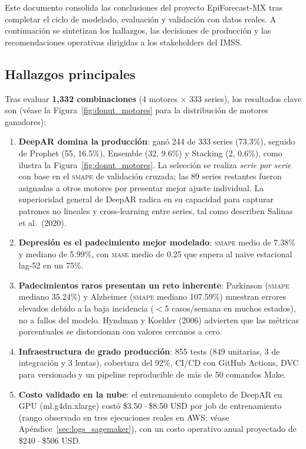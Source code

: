 \documentclass[12pt, letterpaper]{article}
\newcommand{\smape}{\textnormal{\textsc{smape}}}
\newcommand{\mase}{\textnormal{\textsc{mase}}}
\newcommand{\figref}[1]{Figura~\ref{#1}}
\begin{document}
Este documento consolida las conclusiones del proyecto EpiForecast-MX tras completar el ciclo de modelado, evaluación y validación con datos reales. A continuación se sintetizan los hallazgos, las decisiones de producción y las recomendaciones operativas dirigidas a los stakeholders del IMSS.

\subsection{Hallazgos principales}

Tras evaluar \textbf{1,332 combinaciones} (4 motores $\times$ 333 series), los resultados clave son (véase la \figref{fig:donut_motores} para la distribución de motores ganadores):

\begin{enumerate}[noitemsep]
    \item \textbf{DeepAR domina la producción}: ganó 244 de 333 series (73.3\%), seguido de Prophet (55, 16.5\%), Ensemble (32, 9.6\%) y Stacking (2, 0.6\%), como ilustra la \figref{fig:donut_motores}. La selección se realiza \textit{serie por serie} con base en el \smape{} de validación cruzada; las 89 series restantes fueron asignadas a otros motores por presentar mejor ajuste individual. La superioridad general de DeepAR radica en su capacidad para capturar patrones no lineales y cross-learning entre series, tal como describen Salinas et al.\ (2020).
    \item \textbf{Depresión es el padecimiento mejor modelado}: \smape{} medio de 7.38\% y mediano de 5.99\%, con \mase{} medio de 0.25 que supera al naive estacional lag-52 en un 75\%.
    \item \textbf{Padecimientos raros presentan un reto inherente}: Parkinson (\smape{} mediano 35.24\%) y Alzheimer (\smape{} mediano 107.59\%) muestran errores elevados debido a la baja incidencia ($<$5 casos/semana en muchos estados), no a fallos del modelo. Hyndman y Koehler (2006) advierten que las métricas porcentuales se distorsionan con valores cercanos a cero.
    \item \textbf{Infraestructura de grado producción}: 855 tests (849 unitarias, 3 de integración y 3 lentas), cobertura del 92\%, CI/CD con GitHub Actions, DVC para versionado y un pipeline reproducible de más de 50 comandos Make.
    \item \textbf{Costo validado en la nube}: el entrenamiento completo de DeepAR en GPU (ml.g4dn.xlarge) costó \$3.50\,--\,\$8.50 USD por job de entrenamiento (rango observado en tres ejecuciones reales en AWS; véase Apéndice~\ref{sec:logs_sagemaker}), con un costo operativo anual proyectado de \$240\,--\,\$506 USD.
\end{enumerate}
\end{document}
